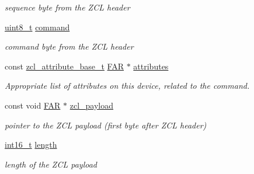 \begin{DoxyCompactItemize}
\begin{DoxyCompactList}\small\item\em sequence byte from the Z\+CL header \end{DoxyCompactList}\item 
\mbox{\label{group__zcl_ga1a5aaa930940857f68f245eeb89506b5}} 
\hyperlink{group__hal__dos_gae1affc9ca37cfb624959c866a73f83c2}{uint8\+\_\+t} \hyperlink{group__zcl_ga1a5aaa930940857f68f245eeb89506b5}{command}
\begin{DoxyCompactList}\small\item\em command byte from the Z\+CL header \end{DoxyCompactList}\item 
const \hyperlink{structzcl__attribute__base__t}{zcl\+\_\+attribute\+\_\+base\+\_\+t} \hyperlink{group__hal_gaef060b3456fdcc093a7210a762d5f2ed}{F\+AR} $\ast$ \hyperlink{group__zcl_ga04c31df34f50e8dd1efaf1105631b2bc}{attributes}
\begin{DoxyCompactList}\small\item\em Appropriate list of attributes on this device, related to the command. \end{DoxyCompactList}\item 
\mbox{\label{group__zcl_gaf0e34793a3febabcdb61c020aecbf805}} 
const void \hyperlink{group__hal_gaef060b3456fdcc093a7210a762d5f2ed}{F\+AR} $\ast$ \hyperlink{group__zcl_gaf0e34793a3febabcdb61c020aecbf805}{zcl\+\_\+payload}
\begin{DoxyCompactList}\small\item\em pointer to the Z\+CL payload (first byte after Z\+CL header) \end{DoxyCompactList}\item 
\mbox{\label{group__zcl_ga0ff9f63e333676ba1359f505d02dd281}} 
\hyperlink{group__hal__dos_ga2140805d08462d474b82ddc8d1c2f3e6}{int16\+\_\+t} \hyperlink{group__zcl_ga0ff9f63e333676ba1359f505d02dd281}{length}
\begin{DoxyCompactList}\small\item\em length of the Z\+CL payload \end{DoxyCompactList}\end{DoxyCompactItemize}
\label{_amgrp01747264fe7bf50731df0522c351974e}%
